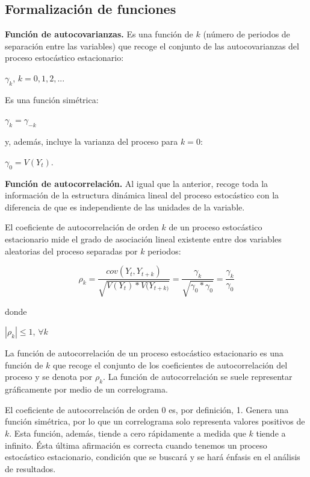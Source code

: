 \documentclass[a4paper,10pt]{article}
\begin{document}
\subsection{Formalización de funciones}

\textbf{Función de autocovarianzas.} Es una función de $k$ (número
de periodos de separación entre las variables) que recoge el conjunto de las autocovarianzas del proceso estocástico estacionario:

\begin{center}
$\gamma_k$, $k=0,1,2,...$
\end{center}

Es una función simétrica:

\begin{center}
$\gamma_k = \gamma_{-k}$
\end{center}

y, además, incluye la varianza del proceso para $k=0$:

\begin{center}
$\gamma_0 = V(Y_t)$.
\end{center}

\textbf{Función de autocorrelación.} Al igual que la anterior, recoge toda la información de la estructura dinámica lineal del proceso estocástico con la diferencia de que es independiente de las unidades de la variable.

El coeficiente de autocorrelación de orden $k$ de un proceso estocástico estacionario mide el grado de asociación lineal existente entre dos variables aleatorias del proceso separadas por $k$ periodos:

\begin{equation}
\rho_k = \frac{cov(Y_t, Y_{t+k})}{\sqrt{V(Y_t)*V(Y_{t+k)}}} = \frac{\gamma_k}{\sqrt{\gamma_0 * \gamma_0}} = \frac{\gamma_k}{\gamma_0}
\end{equation}

donde

\begin{center}
$|\rho_k| \leq 1$, $\forall k$
\end{center}

La función de autocorrelación de un proceso estocástico estacionario es una función de $k$ que
recoge el conjunto de los coeficientes de autocorrelación del proceso y se denota por $\rho_k$. La función de autocorrelación se suele representar gráficamente por medio de un correlograma.

El coeficiente de autocorrelación de orden 0 es, por definición, 1. Genera una función simétrica, por lo que un correlograma solo representa valores positivos de $k$. Esta función, además, tiende a cero rápidamente a medida que $k$ tiende a infinito. Ésta última afirmación es correcta cuando tenemos un proceso estocástico estacionario, condición que se buscará y se hará énfasis en el análisis de resultados.
\end{document}
